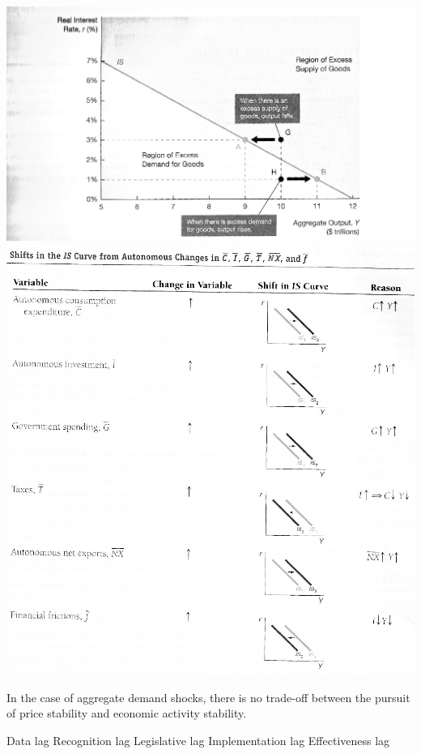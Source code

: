\documentclass[12pt]{examnotes}
\begin{document}
\includegraphics[scale=0.5]{./imgs/211.jpg}
\includegraphics[scale=0.5]{./imgs/212.jpg}



\ra In the case of aggregate demand shocks, there is no trade-off between the pursuit of price stability and economic activity stability.

 Data lag
 Recognition lag
 Legislative lag
 Implementation lag
 Effectiveness lag
\end{document}
